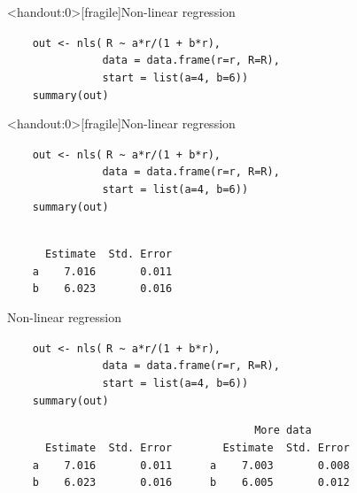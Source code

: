\documentclass[aspectratio=169,12pt,t]{beamer}
\begin{document}
\begin{frame}<handout:0>[fragile]{Non-linear regression}

\vspace{5mm}

{
\verb|    out <- nls(| {\tt \vhilit R \verb|~| a*r/(1 + b*r)}\verb|,| \\
\verb|               data = data.frame(r=r, R=R),| \\
\verb|               start = list(a=4, b=6))| \\
\verb|    summary(out)|
}


\note{
}

\end{frame}


\begin{frame}<handout:0>[fragile]{Non-linear regression}
\addtocounter{framenumber}{-1}

\vspace{5mm}

\verb|    out <- nls(| {\tt \vhilit R \verb|~| a*r/(1 + b*r)}\verb|,| \\
\verb|               data = data.frame(r=r, R=R),| \\
\verb|               start = list(a=4, b=6))| \\
\verb|    summary(out)|

\vspace{8mm}

{\hilit
\verb|                          | \\
\verb|      Estimate  Std. Error| \\
\verb|    a    7.016       0.011| \\
\verb|    b    6.023       0.016|
}


\note{
}

\end{frame}


\begin{frame}[fragile]{Non-linear regression}
\addtocounter{framenumber}{-1}

\vspace{5mm}

\verb|    out <- nls(| {\tt \vhilit R \verb|~| a*r/(1 + b*r)}\verb|,| \\
\verb|               data = data.frame(r=r, R=R),| \\
\verb|               start = list(a=4, b=6))| \\
\verb|    summary(out)|

\vspace{8mm}

{\hilit
\verb|                                       More data      | \\
\verb|      Estimate  Std. Error        Estimate  Std. Error| \\
\verb|    a    7.016       0.011      a    7.003       0.008| \\
\verb|    b    6.023       0.016      b    6.005       0.012|
}


\note{
}

\end{frame}
\end{document}
